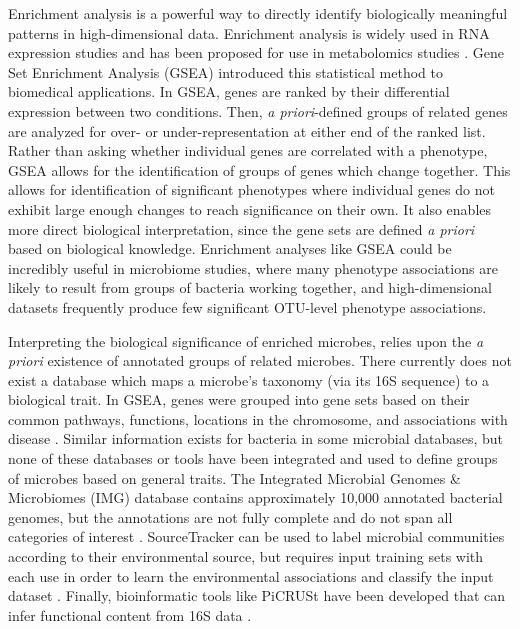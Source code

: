 \documentclass[12pt]{article}
\begin{document}
Enrichment analysis is a powerful way to directly identify biologically 
meaningful patterns in high-dimensional data. Enrichment analysis is 
widely used in RNA expression studies and has been proposed for use in 
metabolomics studies \cite{subramanian-gsea-2005, xia-msea-2010}. 
Gene Set Enrichment Analysis (GSEA) introduced
this statistical method to biomedical applications. In GSEA, genes are 
ranked by their differential expression between two conditions. Then, 
\textit{a priori}-defined groups of related genes are analyzed for 
over- or under-representation at either end of the ranked list. Rather 
than asking whether individual genes are correlated with a phenotype, 
GSEA allows for the identification of groups of genes which change 
together. This allows for identification of significant phenotypes 
where individual genes do not exhibit large enough changes to reach 
significance on their own. It also enables more direct biological 
interpretation, since the gene sets are defined \textit{a priori} 
based on biological knowledge. Enrichment analyses like GSEA
could be incredibly useful in microbiome studies, where 
many phenotype associations are likely to result from groups of
bacteria working together, and high-dimensional datasets
frequently produce few significant OTU-level phenotype associations.

Interpreting the biological significance of enriched microbes,
relies upon the \textit{a priori} existence of annotated groups of 
related microbes.
There currently does not exist a database which maps a microbe's
taxonomy (via its 16S sequence) to a biological trait.
In GSEA, genes were grouped into gene sets based on their common 
pathways, functions, locations in the chromosome, and associations 
with disease \cite{subramanian-gsea-2005}. 
Similar information exists for bacteria in some microbial databases, 
but none of these databases or tools have been integrated and used to define groups 
of microbes based on general traits. 
The Integrated Microbial Genomes \& Microbiomes (IMG) 
database contains approximately 10,000 annotated 
bacterial genomes, but the annotations are not fully complete and do 
not span all categories of interest \cite{markowitz-img-2013}. SourceTracker 
can be used to label microbial communities according to their 
environmental source, but requires input training sets with each use 
in order to learn the environmental associations and classify the input dataset \cite{knights-sourcetracker-2011}. 
Finally, bioinformatic tools like PiCRUSt have been developed that can infer functional 
content from 16S data \cite{langille-picrust-2013}. 
\end{document}
